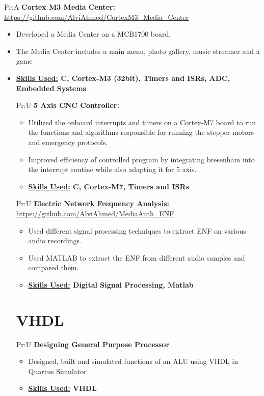 Pr:A
\textbf{Cortex M3 Media Center: } 
\underline{\url{https://github.com/AlviAhmed/CortexM3_Media_Center}}
\begin{itemize}[noitemsep,nolistsep]
\item Developed a Media Center on a MCB1700 board.
\item The Media Center includes a main menu, photo gallery, music streamer and a game 
\item \textbf{ \underline{Skills Used:} C, Cortex-M3 (32bit), Timers and ISRs, ADC,
    Embedded Systems}

  
Pr:U
\textbf{5 Axis CNC Controller: } 
\begin{itemize}[noitemsep,nolistsep]
\item Utilized the onboard interrupts and timers on a Cortex-M7 board to run
  the functions and algorithms responsible for running the stepper motors and emergency protocols.
\item Improved efficiency of controlled program by integrating bresenham into the
  interrupt routine while also adapting it for 5 axis.
\item \textbf{ \underline{Skills Used:} C, Cortex-M7, Timers and ISRs}
\end{itemize}


Pr:U
\textbf{Electric Network Frequency Analysis: }
\underline{\url{https://github.com/AlviAhmed/MediaAuth_ENF}}
\begin{itemize}[noitemsep,nolistsep]
\item Used different signal processing techniques to extract ENF on various audio recordings.
\item Used MATLAB to extract the ENF from different audio samples and compared them.
\item \textbf{\underline{Skills Used:} Digital Signal Processing, Matlab}
\end{itemize}


\section*{VHDL}


Pr:U
\textbf{Designing General Purpose Processor} 
\begin{itemize}[noitemsep,nolistsep]
\item Designed, built and simulated functions of an ALU using VHDL in Quartus Simulator
\item \textbf{ \underline{Skills Used:} VHDL}
\end{itemize}



\end{itemize}
